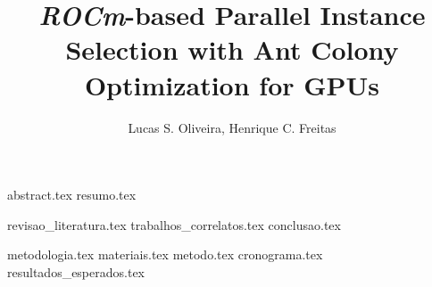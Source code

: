 \documentclass{article}
\title{\emph{ROCm}-based Parallel Instance Selection with Ant Colony Optimization for GPUs}
\author{{Lucas S. Oliveira\inst{1}, Henrique C. Freitas\inst{1}}}
\begin{document}
\maketitle

{abstract.tex}
{resumo.tex}

{revisao_literatura.tex}
{trabalhos_correlatos.tex}
{conclusao.tex}

{metodologia.tex}
{materiais.tex}
{metodo.tex}
{cronograma.tex}
{resultados_esperados.tex}

\printbibliography
\end{document}
